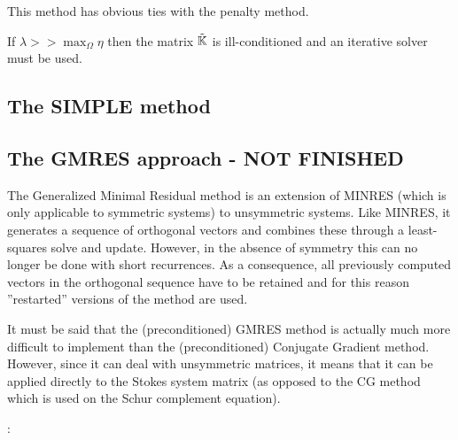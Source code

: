 \begin{remark} 
This method has obvious ties with the penalty method. 
\end{remark}

\begin{remark} 
If $\lambda >> \max_\Omega{\eta}$ then the matrix $\tilde{{\mathbb{K}}}$ is ill-conditioned and an iterative solver must be used.
\end{remark}

\newpage
\subsection{The SIMPLE method}







\newpage
\subsection{The GMRES approach - NOT FINISHED}

The Generalized Minimal Residual method \cite{sasc86} 
is an extension of MINRES (which is only applicable to symmetric systems) 
to unsymmetric systems. 
Like MINRES, it generates a sequence of orthogonal vectors and 
combines these through a least-squares solve and update. However, 
in the absence of symmetry this can no longer be done with short recurrences. As a consequence, 
all previously computed vectors in the orthogonal sequence have to be retained and 
for this reason ''restarted'' versions of the method are used.

It must be said that the (preconditioned) GMRES method is actually 
much more difficult to implement 
than the (preconditioned) Conjugate Gradient method.
However, since it can deal with unsymmetric matrices, it means that it can be applied 
directly to the Stokes system matrix (as opposed to the CG method which 
is used on the Schur complement equation).

 

\Literature: \cite[p208]{eijkhout} \cite{saad,saad93} \cite{babc94} \cite{ayac03}


